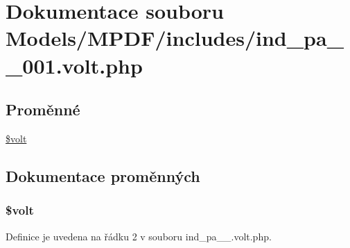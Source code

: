 \hypertarget{ind__pa__1__001_8volt_8php}{\section{Dokumentace souboru Models/\-M\-P\-D\-F/includes/ind\-\_\-pa\-\_\-\_\-001.volt.\-php}
\label{ind__pa__1__001_8volt_8php}
}
\subsection*{Proměnné}
\begin{DoxyCompactItemize}
\item 
\hyperlink{ind__pa__1__001_8volt_8php_a013d9bcd621d002433e25a82dd593989}{\$volt}
\end{DoxyCompactItemize}


\subsection{Dokumentace proměnných}
\hypertarget{ind__pa__1__001_8volt_8php_a013d9bcd621d002433e25a82dd593989}{
\subsubsection[{\$volt}]{\setlength{\rightskip}{0pt plus 5cm}\$volt}}\label{ind__pa__1__001_8volt_8php_a013d9bcd621d002433e25a82dd593989}


Definice je uvedena na řádku 2 v souboru ind\-\_\-pa\-\_\-\_.\-volt.\-php.

